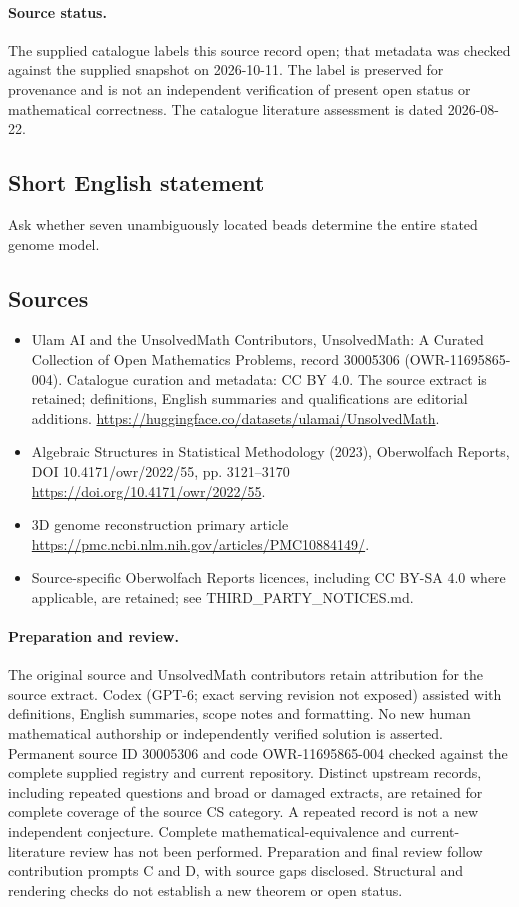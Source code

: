 \documentclass[11pt]{article}
\begin{document}
\paragraph{Source status.}
The supplied catalogue labels this source record open; that metadata was checked against the supplied snapshot on 2026-10-11. The label is preserved for provenance and is not an independent verification of present open status or mathematical correctness. The catalogue literature assessment is dated 2026-08-22.
\subsection{Short English statement}
Ask whether seven unambiguously located beads determine the entire stated genome model.
\subsection{Sources}
\begin{itemize}
\item[S1] Ulam AI and the UnsolvedMath Contributors, UnsolvedMath: A Curated Collection of Open Mathematics Problems, record 30005306 (OWR-11695865-004). Catalogue curation and metadata: CC BY 4.0. The source extract is retained; definitions, English summaries and qualifications are editorial additions.
\url{https://huggingface.co/datasets/ulamai/UnsolvedMath}.
\item[S2] Algebraic Structures in Statistical Methodology (2023), Oberwolfach Reports, DOI 10.4171/owr/2022/55, pp. 3121--3170
\url{https://doi.org/10.4171/owr/2022/55}.
\item[S3] 3D genome reconstruction primary article
\url{https://pmc.ncbi.nlm.nih.gov/articles/PMC10884149/}.
\item Source-specific Oberwolfach Reports licences, including CC BY-SA 4.0 where applicable, are retained; see THIRD\_PARTY\_NOTICES.md.
\end{itemize}
\paragraph{Preparation and review.}
The original source and UnsolvedMath contributors retain attribution for the source extract. Codex (GPT-6; exact serving revision not exposed) assisted with definitions, English summaries, scope notes and formatting. No new human mathematical authorship or independently verified solution is asserted. Permanent source ID 30005306 and code OWR-11695865-004 checked against the complete supplied registry and current repository. Distinct upstream records, including repeated questions and broad or damaged extracts, are retained for complete coverage of the source CS category. A repeated record is not a new independent conjecture. Complete mathematical-equivalence and current-literature review has not been performed. Preparation and final review follow contribution prompts C and D, with source gaps disclosed. Structural and rendering checks do not establish a new theorem or open status.
\label{end:30005306}
\end{document}
